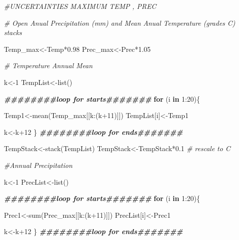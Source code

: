 \documentclass[
  10pt,
  b5paper,
]{book}
\newenvironment{Shaded}{\begin{snugshade}}{\end{snugshade}}
\newcommand{\CommentTok}[1]{\textcolor[rgb]{0.56,0.35,0.01}{\textit{#1}}}
\newcommand{\ControlFlowTok}[1]{\textcolor[rgb]{0.13,0.29,0.53}{\textbf{#1}}}
\newcommand{\DecValTok}[1]{\textcolor[rgb]{0.00,0.00,0.81}{#1}}
\newcommand{\DocumentationTok}[1]{\textcolor[rgb]{0.56,0.35,0.01}{\textbf{\textit{#1}}}}
\newcommand{\FloatTok}[1]{\textcolor[rgb]{0.00,0.00,0.81}{#1}}
\newcommand{\FunctionTok}[1]{\textcolor[rgb]{0.00,0.00,0.00}{#1}}
\newcommand{\NormalTok}[1]{#1}
\newcommand{\OtherTok}[1]{\textcolor[rgb]{0.56,0.35,0.01}{#1}}
\newcommand{\SpecialCharTok}[1]{\textcolor[rgb]{0.00,0.00,0.00}{#1}}
\begin{document}
\begin{Shaded}
\begin{Highlighting}[]
\CommentTok{\#UNCERTAINTIES MAXIMUM TEMP , PREC}

\CommentTok{\# Open Anual Precipitation (mm) and Mean Anual Temperature (grades C) stacks}

\NormalTok{Temp\_max}\OtherTok{\textless{}{-}}\NormalTok{Temp}\SpecialCharTok{*}\FloatTok{0.98}
\NormalTok{Prec\_max}\OtherTok{\textless{}{-}}\NormalTok{Prec}\SpecialCharTok{*}\FloatTok{1.05}

\CommentTok{\# Temperature Annual Mean }

\NormalTok{k}\OtherTok{\textless{}{-}}\DecValTok{1}
\NormalTok{TempList}\OtherTok{\textless{}{-}}\FunctionTok{list}\NormalTok{()}

\DocumentationTok{\#\#\#\#\#\#\#\#loop for starts\#\#\#\#\#\#\#}
\ControlFlowTok{for}\NormalTok{ (i }\ControlFlowTok{in} \DecValTok{1}\SpecialCharTok{:}\DecValTok{20}\NormalTok{)\{}

\NormalTok{Temp1}\OtherTok{\textless{}{-}}\FunctionTok{mean}\NormalTok{(Temp\_max[[k}\SpecialCharTok{:}\NormalTok{(k}\SpecialCharTok{+}\DecValTok{11}\NormalTok{)]])}
\NormalTok{TempList[i]}\OtherTok{\textless{}{-}}\NormalTok{Temp1}

\NormalTok{k}\OtherTok{\textless{}{-}}\NormalTok{k}\SpecialCharTok{+}\DecValTok{12}
\NormalTok{\}}
\DocumentationTok{\#\#\#\#\#\#\#\#loop for ends\#\#\#\#\#\#\#}

\NormalTok{TempStack}\OtherTok{\textless{}{-}}\FunctionTok{stack}\NormalTok{(TempList)}
\NormalTok{TempStack}\OtherTok{\textless{}{-}}\NormalTok{TempStack}\SpecialCharTok{*}\FloatTok{0.1} \CommentTok{\# rescale to C}

\CommentTok{\#Annual Precipitation}

\NormalTok{k}\OtherTok{\textless{}{-}}\DecValTok{1}
\NormalTok{PrecList}\OtherTok{\textless{}{-}}\FunctionTok{list}\NormalTok{()}

\DocumentationTok{\#\#\#\#\#\#\#\#loop for starts\#\#\#\#\#\#\#}
\ControlFlowTok{for}\NormalTok{ (i }\ControlFlowTok{in} \DecValTok{1}\SpecialCharTok{:}\DecValTok{20}\NormalTok{)\{}

\NormalTok{Prec1}\OtherTok{\textless{}{-}}\FunctionTok{sum}\NormalTok{(Prec\_max[[k}\SpecialCharTok{:}\NormalTok{(k}\SpecialCharTok{+}\DecValTok{11}\NormalTok{)]])}
\NormalTok{PrecList[i]}\OtherTok{\textless{}{-}}\NormalTok{Prec1}

\NormalTok{k}\OtherTok{\textless{}{-}}\NormalTok{k}\SpecialCharTok{+}\DecValTok{12}
\NormalTok{\}}
\DocumentationTok{\#\#\#\#\#\#\#\#loop for ends\#\#\#\#\#\#\#}


\end{Highlighting}
\end{Shaded}
\end{document}
